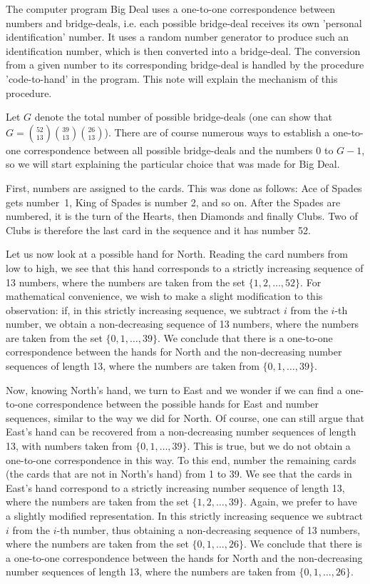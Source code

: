 

The computer program Big Deal uses a one-to-one correspondence
between numbers and bridge-deals, i.e. each possible bridge-deal
receives its own 'personal identification' number. It uses a
random number generator to produce such an identification number,
which is then converted into a bridge-deal. The conversion from
a given number to its corresponding bridge-deal is handled by the
procedure 'code-to-hand' in the program. This note will explain
the mechanism of this procedure.

Let $G$ denote the total number of possible bridge-deals (one
can show that $G = {52\choose 13}{39\choose 13}{26\choose 13}$).
There are of course numerous ways to establish a one-to-one
correspondence between all possible bridge-deals and the numbers
0 to $G-1$, so we will start explaining the particular choice
that was made for Big Deal.

First, numbers are assigned to the cards. This was done as follows:
Ace of Spades gets number~1, King of Spades is number 2, and so on.
After the Spades are numbered, it is the turn of the Hearts, then
Diamonds and finally Clubs. Two of Clubs is therefore the last card
in the sequence and it has number 52.

Let us now look at a possible hand for North. Reading the card numbers
from low to high, we see that this hand
corresponds to a strictly increasing sequence of 13 numbers,
where the numbers are taken from the set $\{1,2,\ldots,52\}$.
For mathematical convenience, we wish to make a slight
modification to this observation: if, in this strictly
increasing sequence, we subtract $i$ from the $i$-th number,
we obtain a non-decreasing sequence of 13 numbers, where
the numbers are taken from the set $\{0,1,\ldots,39\}$. We
conclude that there is a one-to-one correspondence between
the hands for North and the non-decreasing number sequences of
length 13, where the numbers are taken from $\{0,1,\ldots,39\}$.

Now, knowing North's hand, we turn to East and we wonder if we
can find a one-to-one correspondence between the possible hands
for East and number sequences, similar to the way we did for
North. Of course, one can still argue that East's hand can be
recovered from a non-decreasing number sequences of length 13,
with numbers taken from $\{0,1,\ldots,39\}$. This is true, but
we do not obtain a one-to-one correspondence in this way. To
this end, number the remaining cards (the cards that are not in
North's hand) from 1 to 39. We see that the cards in East's hand
correspond to a strictly increasing number sequence of length 13,
where the numbers are taken from the set $\{1,2,\ldots,39\}$.
Again, we prefer to have a slightly modified representation.
In this strictly increasing sequence we subtract $i$ from the
$i$-th number, thus obtaining a non-decreasing sequence of 13
numbers, where the numbers are taken from the set $\{0,1,\ldots,26\}$.
We conclude that there is a one-to-one correspondence between
the hands for North and the non-decreasing number sequences of
length 13, where the numbers are taken from $\{0,1,\ldots,26\}$.


